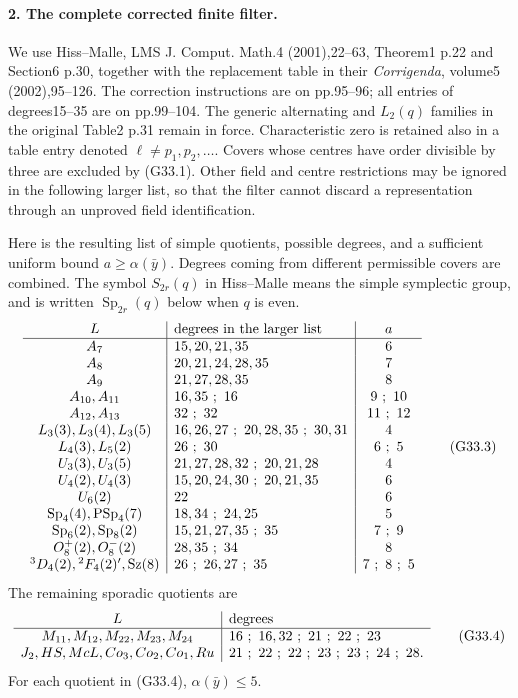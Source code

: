 \paragraph{2. The complete corrected finite filter.}
We use Hiss--Malle, LMS J. Comput. Math.4 (2001),22--63,
Theorem1 p.22 and Section6 p.30, together with the replacement
table in their \emph{Corrigenda}, volume5 (2002),95--126.
The correction instructions are on pp.95--96; all entries of
degrees15--35 are on pp.99--104. The generic alternating and
\(L_2(q)\) families in the original Table2 p.31 remain in force.
Characteristic zero is retained also in a table entry denoted
\(\ell\ne p_1,p_2,\ldots\). Covers whose centres have order
divisible by three are excluded by (G33.1). Other field and centre
restrictions may be ignored in the following larger list, so that
the filter cannot discard a representation through an unproved
field identification.

Here is the resulting list of simple quotients, possible degrees,
and a sufficient uniform bound \(a\ge\alpha(\bar y)\).
Degrees coming from different permissible covers are combined.
The symbol \(S_{2r}(q)\) in Hiss--Malle means the simple
symplectic group, and is written \(\operatorname{Sp}_{2r}(q)\)
below when \(q\) is even.
\[
\begin{array}{c|l|c}
 L&\hbox{degrees in the larger list}&a\\\hline
 A_7&15,20,21,35&6\\
 A_8&20,21,24,28,35&7\\
 A_9&21,27,28,35&8\\
 A_{10},A_{11}&16,35\ ;\ 16&9\ ;\ 10\\
 A_{12},A_{13}&32\ ;\ 32&11\ ;\ 12\\
 L_3(3),L_3(4),L_3(5)&16,26,27\ ;\ 20,28,35\ ;\ 30,31&4\\
 L_4(3),L_5(2)&26\ ;\ 30&6\ ;\ 5\\
 U_3(3),U_3(5)&21,27,28,32\ ;\ 20,21,28&4\\
 U_4(2),U_4(3)&15,20,24,30\ ;\ 20,21,35&6\\
 U_6(2)&22&6\\
 \operatorname{Sp}_4(4),\operatorname{PSp}_4(7)&18,34\ ;\ 24,25&5\\
 \operatorname{Sp}_6(2),\operatorname{Sp}_8(2)&15,21,27,35\ ;\ 35&7\ ;\ 9\\
 O_8^+(2),O_8^-(2)&28,35\ ;\ 34&8\\
 {}^3D_4(2),{}^2F_4(2)',\operatorname{Sz}(8)&26\ ;\ 26,27\ ;\ 35&7\ ;\ 8\ ;\ 5
\end{array}                                                    \tag{G33.3}
\]
The remaining sporadic quotients are
\[
\begin{array}{c|l}
L&\hbox{degrees}\\\hline
M_{11},M_{12},M_{22},M_{23},M_{24}&16\ ;\ 16,32\ ;\ 21\ ;\ 22\ ;\ 23\\
J_2,HS,McL,Co_3,Co_2,Co_1,Ru&21\ ;\ 22\ ;\ 22\ ;\ 23\ ;\ 23\ ;\ 24\ ;\ 28.
\end{array}                                                    \tag{G33.4}
\]
For each quotient in (G33.4), \(\alpha(\bar y)\le5\).

